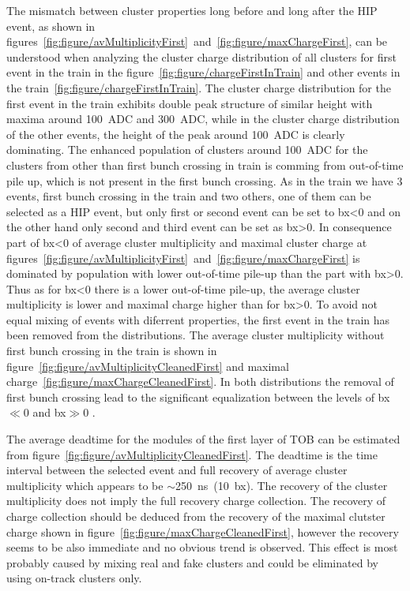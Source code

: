 The mismatch between cluster properties long before and long after the HIP event, as shown in figures~\ref{fig:figure/avMultiplicityFirst}~and~\ref{fig:figure/maxChargeFirst}, can be understood when analyzing the cluster charge distribution of all clusters for first event in the train in the figure~\ref{fig:figure/chargeFirstInTrain} and other events in the train~\ref{fig:figure/chargeFirstInTrain}. The cluster charge distribution for the first event in the train exhibits double peak structure of similar height with maxima around 100~ADC and 300~ADC, while in the cluster charge distribution of the other events, the height of the peak around 100~ADC is clearly dominating. The enhanced population of clusters around 100~ADC for the clusters from other than first bunch crossing in train is comming from out-of-time pile up, which is not present in the first bunch crossing. As in the train we have 3 events, first bunch crossing in the train and two others, one of them can be selected as a HIP event, but only first or second event can be set to bx<0 and on the other hand only second and third event can be set as bx>0. In consequence part of bx<0 of average cluster multiplicity and maximal cluster charge at figures~\ref{fig:figure/avMultiplicityFirst}~and~\ref{fig:figure/maxChargeFirst} is dominated by population with lower out-of-time pile-up than the part with bx>0. Thus as for bx<0 there is a lower out-of-time pile-up, the average cluster multiplicity is lower and maximal charge higher than for bx>0. To avoid not equal mixing of events with diferrent properties, the first event in the train has been removed from the distributions. The average cluster multiplicity without first bunch crossing in the train is shown in figure~\ref{fig:figure/avMultiplicityCleanedFirst} and maximal charge~\ref{fig:figure/maxChargeCleanedFirst}. In both distributions the removal of first bunch crossing lead to the significant equalization between the levels of bx$\ll$0 and bx$\gg$0 .


The average deadtime for the modules of the first layer of TOB can be estimated from figure~\ref{fig:figure/avMultiplicityCleanedFirst}. The deadtime is the time interval between the selected event and full recovery of average cluster multiplicity which appears to be $\sim$250~ns~(10~bx). The recovery of the cluster multiplicity does not imply the full recovery charge collection. The recovery of charge collection should be deduced from the recovery of the maximal clutster charge shown in figure~\ref{fig:figure/maxChargeCleanedFirst}, however the recovery seems to be also immediate and no obvious trend is observed. This effect is most probably caused by mixing real and fake clusters and could be eliminated by using on-track clusters only.

